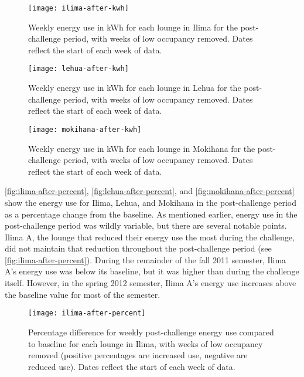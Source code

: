 \begin{figure}[htbp]
	\centering
	\texttt{[image: ilima-after-kwh]}
	\caption[Weekly post-challenge energy use for each lounge in Ilima]{Weekly energy use in kWh for each lounge in Ilima for the post-challenge period, with weeks of low occupancy removed. Dates reflect the start of each week of data.}
	\label{fig:ilima-after-kwh}
\end{figure}

\begin{figure}[htbp]
	\centering
	\texttt{[image: lehua-after-kwh]}
	\caption[Weekly post-challenge energy use for each lounge in Lehua]{Weekly energy use in kWh for each lounge in Lehua for the post-challenge period, with weeks of low occupancy removed. Dates reflect the start of each week of data.}
	\label{fig:lehua-after-kwh}
\end{figure}

\begin{figure}[htbp]
	\centering
	\texttt{[image: mokihana-after-kwh]}
	\caption[Weekly post-challenge energy use for each lounge in Mokihana]{Weekly energy use in kWh for each lounge in Mokihana for the post-challenge period, with weeks of low occupancy removed. Dates reflect the start of each week of data.}
	\label{fig:mokihana-after-kwh}
\end{figure}

\autoref{fig:ilima-after-percent}, \autoref{fig:lehua-after-percent}, and \autoref{fig:mokihana-after-percent} show the energy use for Ilima, Lehua, and Mokihana in the post-challenge period as a percentage change from the baseline. As mentioned earlier, energy use in the post-challenge period was wildly variable, but there are several notable points. Ilima A, the lounge that reduced their energy use the most during the challenge, did not maintain that reduction throughout the post-challenge period (see \autoref{fig:ilima-after-percent}). During the remainder of the fall 2011 semester, Ilima A's energy use was below its baseline, but it was higher than during the challenge itself. However, in the spring 2012 semester, Ilima A's energy use increases above the baseline value for most of the semester.

\begin{figure}[htbp]
	\centering
	\texttt{[image: ilima-after-percent]}
	\caption[Percentage post-challenge energy use difference from baseline for Ilima]{Percentage difference for weekly post-challenge energy use compared to baseline for each lounge in Ilima, with weeks of low occupancy removed (positive percentages are increased use, negative are reduced use). Dates reflect the start of each week of data.}
	\label{fig:ilima-after-percent}
\end{figure}

